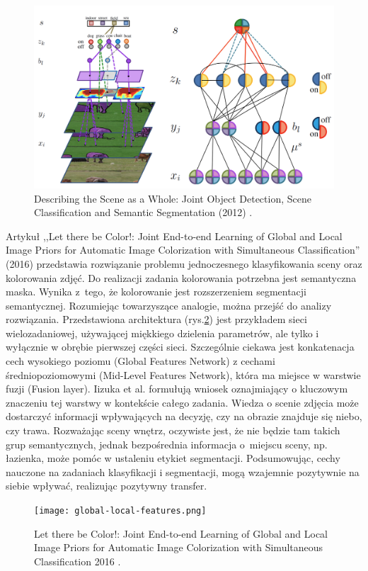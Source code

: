 \begin{figure}[ht!]
    \includegraphics[width=\textwidth]{img/joint-segmentation-and-classification.png}
    \caption{Describing the Scene as a Whole: Joint Object Detection, Scene Classification and Semantic Segmentation (2012) \cite{yao2012describing}.}
    \label{fig:scene-as-a-whole}
\end{figure}
\vspace{0.5cm}
Artykuł ,,Let there be Color!: Joint End-to-end Learning of Global and Local Image Priors for Automatic Image Colorization with Simultaneous Classification'' (2016) \cite{iizuka2016let} przedstawia rozwiązanie problemu jednoczesnego klasyfikowania sceny oraz kolorowania zdjęć. Do realizacji zadania kolorowania potrzebna jest semantyczna maska. Wynika z~tego, że kolorowanie jest rozszerzeniem segmentacji semantycznej. Rozumiejąc towarzyszące analogie, można przejść do analizy rozwiązania. Przedstawiona architektura (rys.\ref{fig:parrarel-arch}) jest przykładem sieci wielozadaniowej, używającej miękkiego dzielenia parametrów, ale tylko i wyłącznie w obrębie pierwszej części sieci. Szczególnie ciekawa jest konkatenacja cech wysokiego poziomu (Global Features Network) z cechami średniopoziomowymi (Mid-Level Features Network), która ma miejsce w warstwie fuzji (Fusion layer). Iizuka et al. formułują wniosek oznajmiający o kluczowym znaczeniu tej warstwy w kontekście całego zadania. Wiedza o scenie zdjęcia może dostarczyć informacji wpływających na decyzję, czy na obrazie znajduje się niebo, czy trawa. Rozważając sceny wnętrz, oczywiste jest, że nie będzie tam takich grup semantycznych, jednak bezpośrednia informacja o~miejscu sceny, np. łazienka, może pomóc w ustaleniu etykiet segmentacji. Podsumowując, cechy nauczone na zadaniach klasyfikacji i segmentacji, mogą wzajemnie pozytywnie na siebie wpływać, realizując pozytywny transfer.
\begin{figure}[ht!]
    \texttt{[image: global-local-features.png]}
    \caption{Let there be Color!: Joint End-to-end Learning of Global and Local Image Priors for Automatic Image Colorization with Simultaneous Classification 2016 \cite{iizuka2016let}.}
    \label{fig:parrarel-arch}
\end{figure}


